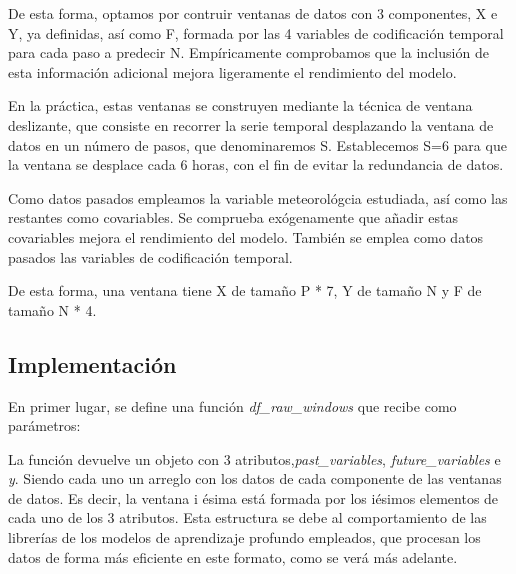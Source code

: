De esta forma, optamos por contruir ventanas de datos con 3 componentes, X e Y, ya definidas, así como F, formada por las 4 variables de codificación temporal 
para cada paso a predecir N. Empíricamente comprobamos que la inclusión de esta información adicional mejora ligeramente el rendimiento del modelo.

En la práctica, estas ventanas se construyen mediante la técnica de ventana deslizante, que consiste en recorrer la serie temporal desplazando 
la ventana de datos en un número de pasos, que denominaremos S. Establecemos S=6 para que la ventana se desplace cada 6 horas, con el fin de evitar 
la redundancia de datos.

Como datos pasados empleamos la variable meteorológcia estudiada, así como las restantes como covariables. Se comprueba exógenamente que 
añadir estas covariables mejora el rendimiento del modelo. También se emplea como datos pasados las variables de codificación temporal. 

De esta forma, una ventana tiene X de tamaño P * 7, Y de tamaño N y F de tamaño N * 4.

\subsection{Implementación}
En primer lugar, se define una función \textit{df\_raw\_windows} que recibe como parámetros:

La función devuelve un objeto con 3 atributos,\textit{past\_variables}, \textit{future\_variables} e \textit{y}.
Siendo cada uno un arreglo con los datos de cada componente de las ventanas de datos. Es decir, la ventana i ésima
está formada por los iésimos elementos de cada uno de los 3 atributos. Esta estructura se debe al comportamiento
de las librerías de los modelos de aprendizaje profundo empleados, que procesan los datos de forma más eficiente en este formato,
como se verá más adelante.

